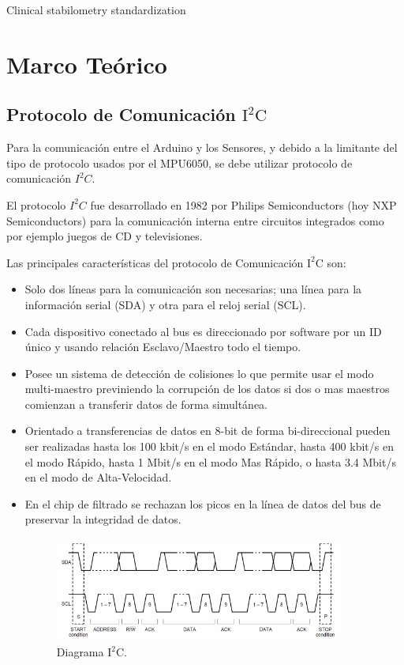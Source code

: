 \documentclass[12pt,a4paper]{article}
\begin{document}
			Clinical stabilometry standardization\cite{scoppa_clinical_2013}
			
			
			
			\section{Marco Teórico}
			
			\subsection{Protocolo de Comunicación $\mathbf{\mathrm{I^2C}}$}
			Para la comunicación entre el Arduino y los Sensores, y debido a la limitante del tipo de protocolo usados por el MPU6050, se debe utilizar protocolo de comunicación $I^2C$.
			
			El protocolo $I^2C$ fue desarrollado en 1982 por Philips Semiconductors (hoy NXP Semiconductors) para la comunicación interna entre circuitos integrados como por ejemplo juegos de CD y televisiones.
			
			Las principales características del protocolo de Comunicación $\mathrm{I^2C}$ \cite{I2C} son:
			\begin{itemize}
				\item Solo dos líneas para la comunicación son necesarias; una línea para la información serial (SDA) y otra para el reloj serial (SCL).
				
				\item Cada dispositivo conectado al bus es direccionado por software por un ID único y usando relación Esclavo/Maestro todo el tiempo.
				
				\item Posee un sistema de detección de colisiones lo que permite usar el modo multi-maestro previniendo la corrupción de los datos si dos o mas maestros comienzan a transferir datos de forma simultánea.
				
				\item Orientado a transferencias de datos en 8-bit de forma bi-direccional pueden ser realizadas hasta los 100 kbit/s en el modo Estándar, hasta 400 kbit/s en el modo Rápido, hasta 1 Mbit/s en el modo Mas Rápido, o hasta 3.4 Mbit/s en el modo de Alta-Velocidad.
				
				\item En el chip de filtrado se rechazan los picos en la línea de datos del bus de preservar la integridad de datos.
				
				\begin{figure}[H]
					\centering
					\includegraphics[width=0.9\textwidth]{images/Diagrama_I2C}
					\caption{Diagrama $\mathrm{I^2C.}$}
					\label{fig:diagramaI2C}
				\end{figure}
			\end{itemize}
			
\end{document}
